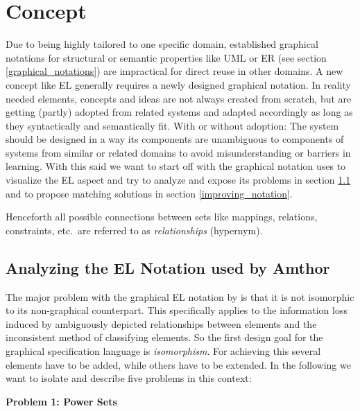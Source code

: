 \documentclass[twoside, openright, 12pt]{book}
\begin{document}
\section{Concept}
\label{gsl_concept}

Due to being highly tailored to one specific domain, established graphical notations for structural or semantic properties like UML or ER (see section \ref{graphical_notations}) are impractical for direct reuse in other domains.
A new concept like EL generally requires a newly designed graphical notation.
In reality needed elements, concepts and ideas are not always created from scratch, but are getting (partly) adopted from related systems and adapted accordingly as long as they syntactically and semantically fit.
With or without adoption: The system should be designed in a way its components are unambiguous to components of systems from similar or related domains to avoid misunderstanding or barriers in learning.
With this said we want to start off with the graphical notation \cite{Amthor18} uses to visualize the EL aspect and try to analyze and expose its problems in section \ref{analyzing_notation} and to propose matching solutions in section \ref{improving_notation}.

\begin{mdframed}[style=mystyle,frametitle=Note]
Henceforth all possible connections between sets like mappings, relations, constraints, etc.~are referred to as \textit{relationships} (hypernym).
\end{mdframed}



\subsection{Analyzing the EL Notation used by Amthor}
\label{analyzing_notation}
The major problem with the graphical EL notation by \cite{Amthor18} is that it is not isomorphic to its non-graphical counterpart.
This specifically applies to the information loss induced by ambiguously depicted relationships between elements and the inconsistent method of classifying elements.
So the first design goal for the graphical specification language is \textit{isomorphism}.
For achieving this several elements have to be added, while others have to be extended.
In the following we want to isolate and describe five problems in this context:

\vspace{6mm}
\noindent
\textbf{Problem 1: Power Sets}
\vspace{1mm}
\end{document}
